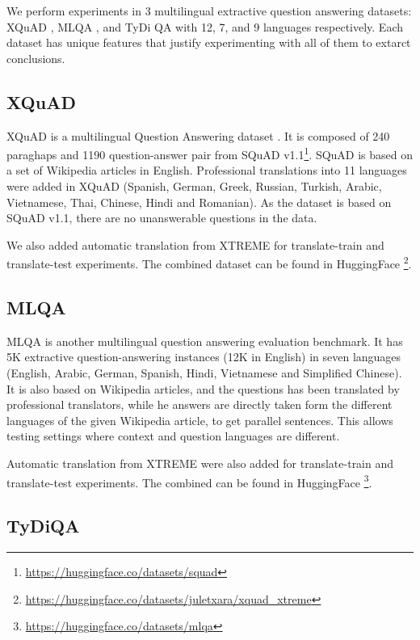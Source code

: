 \documentclass[11pt]{article}
\begin{document}
We perform experiments in 3 multilingual extractive question answering datasets: XQuAD \cite{Artetxe:etal:2019}, MLQA \cite{lewis2019mlqa}, and TyDi QA \cite{tydiqa} with 12, 7, and 9 languages respectively. Each dataset has unique features that justify experimenting with all of them to extarct conclusions.

\subsection{XQuAD}

XQuAD is a multilingual Question Answering dataset \cite{Artetxe:etal:2019}. It is composed of 240 paraghaps and 1190 question-answer pair from SQuAD v1.1\footnote{\url{https://huggingface.co/datasets/squad}}. SQuAD is based on a set of Wikipedia articles in English. Professional translations into 11 languages were added in XQuAD (Spanish, German, Greek, Russian, Turkish, Arabic, Vietnamese, Thai, Chinese, Hindi and Romanian). As the dataset is based on SQuAD v1.1, there are no unanswerable questions in the data. 

We also added automatic translation from XTREME \cite{XTREME} for translate-train and translate-test experiments. The combined dataset can be found in HuggingFace \footnote{\url{https://huggingface.co/datasets/juletxara/xquad_xtreme}}.

\subsection{MLQA}

MLQA \cite{lewis2019mlqa} is another multilingual question answering evaluation benchmark. It has 5K extractive question-answering instances (12K in English) in seven languages (English, Arabic, German, Spanish, Hindi, Vietnamese and Simplified Chinese). It is also based on Wikipedia articles, and the questions has been translated by professional translators, while he answers are directly taken form the different languages of the given Wikipedia article, to get parallel sentences. This allows testing settings where context and question languages are different.

Automatic translation from XTREME \cite{XTREME} were also added for translate-train and translate-test experiments. The combined can be found in HuggingFace \footnote{\url{https://huggingface.co/datasets/mlqa}}.

\subsection{TyDiQA}
\end{document}
